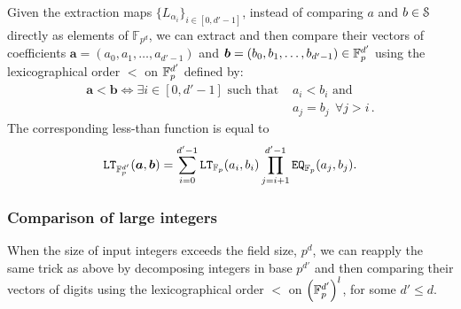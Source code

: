   Given the extraction maps $\{L_{\alpha_i}\}_{i\in[0,d'-1]}$, instead of comparing $a$ and $b\in\S$ directly as elements of $\mathbb{F}_{p^d}$, we can extract and then compare their vectors of coefficients $\bm{a} = (a_0,a_1,\ldots,a_{d'-1})$ and $\bm{b} = (b_0,b_1,\ldots,b_{d'-1}) \in \F_p^{d'}$ using the lexicographical order $\bm{<}$ on $\F_{p}^{d'}$ defined by:
   \begin{align*}
      \bm{a} \bm{<} \bm{b} \Leftrightarrow \exists i\in[0,d'-1] \text{ such that } & a_i < b_i \text{ and } \\
       & a_j = b_j ~~ \forall j > i \,.
    \end{align*}
    The corresponding less-than function is equal to
    \begin{align*}
      \LT_{\F_p^{d'}}(\bm{a}, \bm{b}) = \sum_{i=0}^{d'-1} \LT_{\F_{p}}(a_{i}, b_{i}) \prod_{j=i+1}^{d'-1} \EQ_{\F_{p}}(a_{j}, b_{j}).
    \end{align*}

\subsubsection{Comparison of large integers}\label{sec:comparison_of_large_integers}
When the size of input integers exceeds the field size, $p^d$, we can reapply the same trick as above by decomposing integers in base $p^{d'}$ and then comparing their vectors of digits using the lexicographical order $\bm{<}$ on $\left(\F_{p}^{d'}\right)^l$, for some $d' \le d$.

